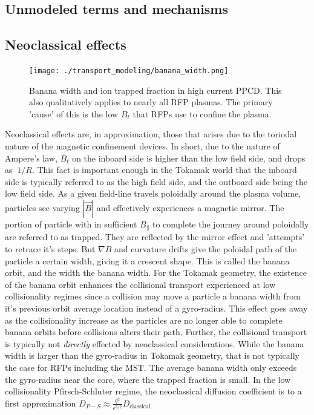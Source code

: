 \begin{refsection}
\section{Unmodeled terms and mechanisms}

\subsection{Neoclassical effects}
\begin{figure}[!htb]
	\centering
	\texttt{[image: ./transport\_modeling/banana\_width.png]}
    \caption[Banana width and ion trapped fraction in PPCD]{Banana width and ion trapped fraction in high current PPCD. This also qualitatively applies to nearly all RFP plasmas. The primary 'cause' of this is the low $B_t$ that RFPs use to confine the plasma.}
    \label{fig:banana_width}
\end{figure}%
Neoclassical effects are, in approximation, those that arises due to the toriodal nature of the magnetic confinement devices. In short, due to the nature of Ampere's law, $B_t$ on the inboard side is higher than the low field side, and drops as $~1/R$. This fact is important enough in the Tokamak world that the inboard side is typically referred to as the high field side, and the outboard side being the low field side. As a given field-line travels poloidally around the plasma volume, particles see varying $|\vec{B}|$ and effectively experiences a magnetic mirror. The portion of particle with in sufficient $B_{\parallel}$ to complete the journey around poloidally are referred to as trapped. They are reflected by the mirror effect and 'attempts' to retrace it's steps. But $\nabla B$ and curvature drifts give the poloidal path of the particle a certain width, giving it a crescent shape. This is called the banana orbit, and the width the banana width. For the Tokamak geometry, the existence of the banana orbit enhances the collisional transport experienced at low collisionality regimes since a collision may move a particle a banana width from it's previous orbit average location instead of a gyro-radius. This effect goes away as the collisionality increase as the particles are no longer able to complete banana orbits before collisions alters their path. Further, the collisional transport is typically not \emph{directly} effected by neoclassical considerations. While the banana width is larger than the gyro-radius in Tokamak geometry, that is not typically the case for RFPs including the MST. The average banana width only exceeds the gyro-radius near the core, where the trapped fraction is small. In the low collisionality Pfirsch-Schluter regime, the neoclassical diffusion coefficient is to a first approximation $D_{P-S} \approx \frac{q^2}{\epsilon^{3/2}}D_{\text{classical}}$


\end{refsection}
